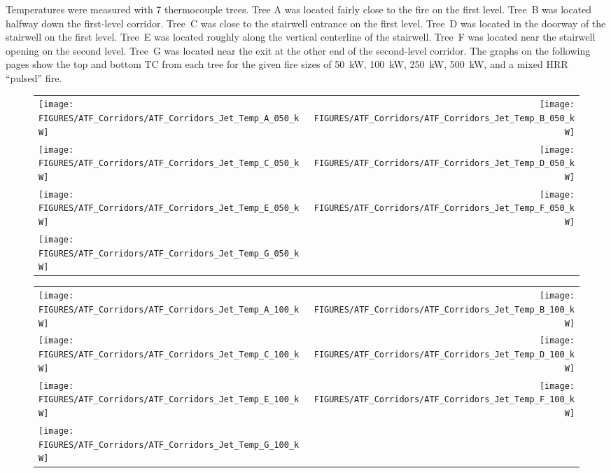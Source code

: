 Temperatures were measured with 7 thermocouple trees. Tree A was located fairly close to the fire on the first level. Tree~B
was located halfway down the first-level corridor. Tree~C was close to the stairwell entrance on the first level. Tree~D was located
in the doorway of the stairwell on the first level. Tree~E was located roughly along the vertical centerline of the
stairwell. Tree~F was located near the stairwell opening on the second level. Tree~G was located near the exit at the
other end of the second-level corridor. The graphs on the following pages show the top and bottom TC from each tree for
the given fire sizes of 50~kW, 100~kW, 250~kW, 500~kW, and a mixed HRR ``pulsed'' fire.

\begin{figure}[p]
\begin{tabular*}{\textwidth}{l@{\extracolsep{\fill}}r}
\texttt{[image: FIGURES/ATF\_Corridors/ATF\_Corridors\_Jet\_Temp\_A\_050\_kW]} &
\texttt{[image: FIGURES/ATF\_Corridors/ATF\_Corridors\_Jet\_Temp\_B\_050\_kW]} \\
\texttt{[image: FIGURES/ATF\_Corridors/ATF\_Corridors\_Jet\_Temp\_C\_050\_kW]} &
\texttt{[image: FIGURES/ATF\_Corridors/ATF\_Corridors\_Jet\_Temp\_D\_050\_kW]} \\
\texttt{[image: FIGURES/ATF\_Corridors/ATF\_Corridors\_Jet\_Temp\_E\_050\_kW]} &
\texttt{[image: FIGURES/ATF\_Corridors/ATF\_Corridors\_Jet\_Temp\_F\_050\_kW]} \\
\texttt{[image: FIGURES/ATF\_Corridors/ATF\_Corridors\_Jet\_Temp\_G\_050\_kW]} &
\end{tabular*}
\label{ATF_Corridors_Jet_Temp_50_kW}
\end{figure}

\begin{figure}[p]
\begin{tabular*}{\textwidth}{l@{\extracolsep{\fill}}r}
\texttt{[image: FIGURES/ATF\_Corridors/ATF\_Corridors\_Jet\_Temp\_A\_100\_kW]} &
\texttt{[image: FIGURES/ATF\_Corridors/ATF\_Corridors\_Jet\_Temp\_B\_100\_kW]} \\
\texttt{[image: FIGURES/ATF\_Corridors/ATF\_Corridors\_Jet\_Temp\_C\_100\_kW]} &
\texttt{[image: FIGURES/ATF\_Corridors/ATF\_Corridors\_Jet\_Temp\_D\_100\_kW]} \\
\texttt{[image: FIGURES/ATF\_Corridors/ATF\_Corridors\_Jet\_Temp\_E\_100\_kW]} &
\texttt{[image: FIGURES/ATF\_Corridors/ATF\_Corridors\_Jet\_Temp\_F\_100\_kW]} \\
\texttt{[image: FIGURES/ATF\_Corridors/ATF\_Corridors\_Jet\_Temp\_G\_100\_kW]} &
\end{tabular*}
\label{ATF_Corridors_Jet_Temp_100_kW}
\end{figure}

